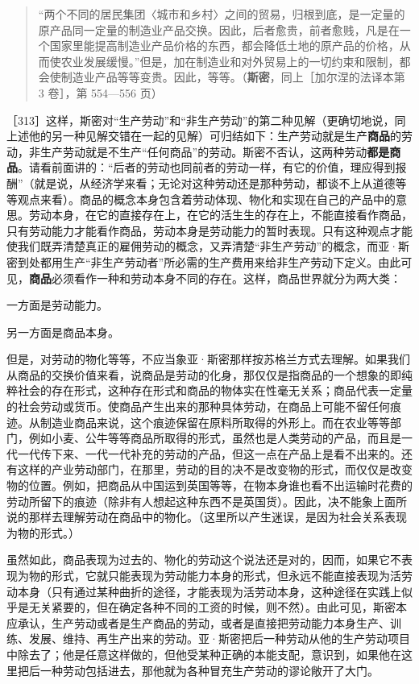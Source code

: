 \begin{quote}“两个不同的居民集团〈城市和乡村〉之间的贸易，归根到底，是一定量的原产品同一定量的制造业产品交换。因此，后者愈贵，前者愈贱，凡是在一个国家里能提高制造业产品价格的东西，都会降低土地的原产品的价格，从而使农业发展缓慢。”但是，加在制造业和对外贸易上的一切约束和限制，都会使制造业产品等等变贵。因此，等等。（\textbf{斯密}，同上［加尔涅的法译本第 3 卷］，第 554—556 页）\fontbox{\}~}\end{quote}


［313］这样，斯密对“生产劳动”和“非生产劳动”的第二种见解（更确切地说，同上述他的另一种见解交错在一起的见解）可归结如下：生产劳动就是生产\textbf{商品}的劳动，非生产劳动就是不生产“任何商品”的劳动。斯密不否认，这两种劳动\textbf{都是商品}。请看前面讲的：“后者的劳动也同前者的劳动一样，有它的价值，理应得到报酬”（就是说，从经济学来看；无论对这种劳动还是那种劳动，都谈不上从道德等等观点来看）。商品的概念本身包含着劳动体现、物化和实现在自己的产品中的意思。劳动本身，在它的直接存在上，在它的活生生的存在上，不能直接看作商品，只有劳动能力才能看作商品，劳动本身是劳动能力的暂时表现。只有这种观点才能使我们既弄清楚真正的雇佣劳动的概念，又弄清楚“非生产劳动”的概念，而亚·斯密到处都用生产“非生产劳动者”所必需的生产费用来给非生产劳动下定义。由此可见，\textbf{商品}必须看作一种和劳动本身不同的存在。这样，商品世界就分为两大类：

一方面是劳动能力。

另一方面是商品本身。

但是，对劳动的物化等等，不应当象亚·斯密那样按苏格兰方式去理解。如果我们从商品的交换价值来看，说商品是劳动的化身，那仅仅是指商品的一个想象的即纯粹社会的存在形式，这种存在形式和商品的物体实在性毫无关系；商品代表一定量的社会劳动或货币。使商品产生出来的那种具体劳动，在商品上可能不留任何痕迹。从制造业商品来说，这个痕迹保留在原料所取得的外形上。而在农业等等部门，例如小麦、公牛等等商品所取得的形式，虽然也是人类劳动的产品，而且是一代一代传下来、一代一代补充的劳动的产品，但这一点在产品上是看不出来的。还有这样的产业劳动部门，在那里，劳动的目的决不是改变物的形式，而仅仅是改变物的位置。例如，把商品从中国运到英国等等，在物本身谁也看不出运输时花费的劳动所留下的痕迹（除非有人想起这种东西不是英国货）。因此，决不能象上面所说的那样去理解劳动在商品中的物化。（这里所以产生迷误，是因为社会关系表现为物的形式。）

虽然如此，商品表现为过去的、物化的劳动这个说法还是对的，因而，如果它不表现为物的形式，它就只能表现为劳动能力本身的形式，但永远不能直接表现为活劳动本身（只有通过某种曲折的途径，才能表现为活劳动本身，这种途径在实践上似乎是无关紧要的，但在确定各种不同的工资的时候，则不然）。由此可见，斯密本应承认，生产劳动或者是生产商品的劳动，或者是直接把劳动能力本身生产、训练、发展、维持、再生产出来的劳动。亚·斯密把后一种劳动从他的生产劳动项目中除去了；他是任意这样做的，但他受某种正确的本能支配，意识到，如果他在这里把后一种劳动包括进去，那他就为各种冒充生产劳动的谬论敞开了大门。

